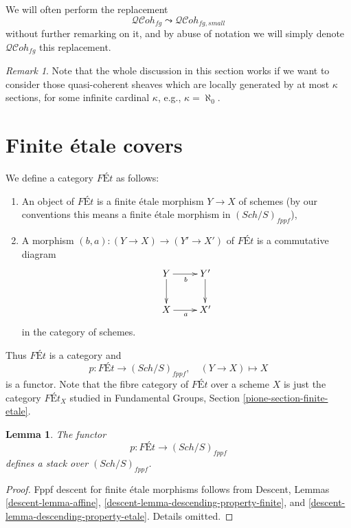\documentclass{stacks-project}
\theoremstyle{plain}
\newtheorem{lemma}[subsection]{Lemma}
\theoremstyle{definition}
\theoremstyle{remark}
\newtheorem{remark}[subsection]{Remark}
\numberwithin{equation}{subsection}
\def\Sch{\mathit{Sch}}
\def\QCohstack{\mathcal{QC}\!\mathit{oh}}
\begin{document}
\noindent
We will often perform the replacement
$$
\QCohstack_{fg} \leadsto \QCohstack_{fg, small}
$$
without further remarking on it, and by abuse of notation we will
simply denote $\QCohstack_{fg}$ this replacement.

\begin{remark}
\label{remark-higher-rank}
Note that the whole discussion in this section works
if we want to consider those
quasi-coherent sheaves which are locally generated by at most $\kappa$
sections, for some infinite cardinal $\kappa$, e.g., $\kappa = \aleph_0$.
\end{remark}





\section{Finite \'etale covers}
\label{section-finite-etale}

\noindent
We define a category $\textit{F\'Et}$ as follows:
\begin{enumerate}
\item An object of $\textit{F\'Et}$ is a finite \'etale morphism $Y \to X$
of schemes (by our conventions this means a finite \'etale morphism
in $(\Sch/S)_{fppf}$),
\item A morphism $(b, a) : (Y \to X) \to (Y' \to X')$ of $\textit{F\'Et}$
is a commutative diagram
$$
\xymatrix{
Y \ar[d] \ar[r]_b & Y' \ar[d] \\
X \ar[r]_a & X'
}
$$
in the category of schemes.
\end{enumerate}
Thus $\textit{F\'Et}$ is a category and
$$
p : \textit{F\'Et} \to (\Sch/S)_{fppf},
\quad
(Y \to X) \mapsto X
$$
is a functor. Note that the fibre category of $\textit{F\'Et}$ over
a scheme $X$ is just the category $\textit{F\'Et}_X$ studied in
Fundamental Groups, Section \ref{pione-section-finite-etale}.

\begin{lemma}
\label{lemma-finite-etale-stack}
The functor
$$
p : \textit{F\'Et} \longrightarrow (\Sch/S)_{fppf}
$$
defines a stack over $(\Sch/S)_{fppf}$.
\end{lemma}

\begin{proof}
Fppf descent for finite \'etale morphisms follows from
Descent, Lemmas \ref{descent-lemma-affine},
\ref{descent-lemma-descending-property-finite}, and
\ref{descent-lemma-descending-property-etale}.
Details omitted.
\end{proof}
\end{document}
